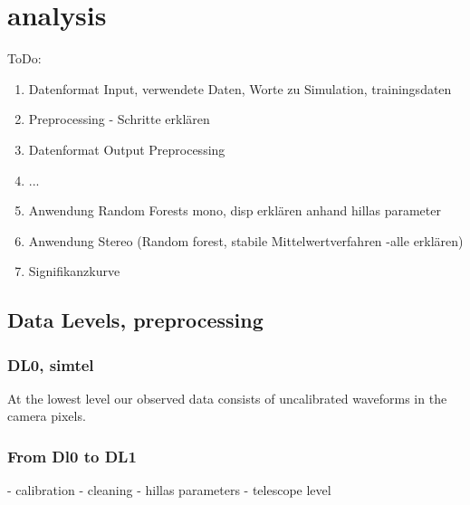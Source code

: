 \chapter{analysis}\label{analysis}

ToDo:
\begin{enumerate}[nosep]
    \item Datenformat Input, verwendete Daten, Worte zu Simulation, trainingsdaten
    \item Preprocessing - Schritte erklären
    \item Datenformat Output Preprocessing
    \item ...
    \item Anwendung Random Forests mono, disp erklären anhand hillas parameter
    \item Anwendung Stereo (Random forest, stabile Mittelwertverfahren -alle erklären)
    \item Signifikanzkurve
\end{enumerate}

\section{Data Levels, preprocessing}

\subsection{DL0, simtel}
At the lowest level our observed data consists of uncalibrated waveforms 
in the camera pixels.

\subsection{From Dl0 to DL1}

- calibration
- cleaning
- hillas parameters 
- telescope level



